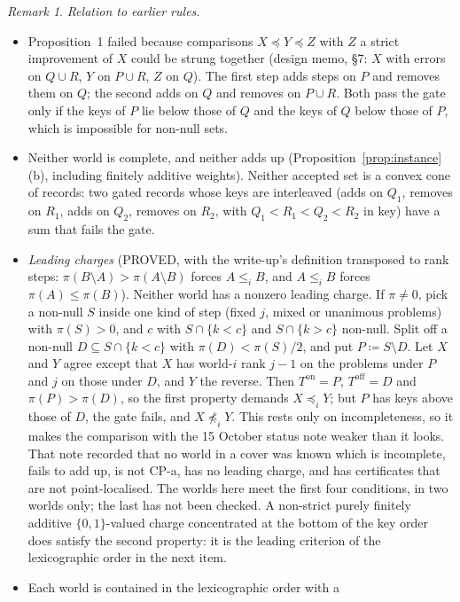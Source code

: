 \documentclass[11pt]{article}
\theoremstyle{definition}\newtheorem{definition}[theorem]{Definition}
\theoremstyle{remark}\newtheorem{remark}[theorem]{Remark}
\newcommand{\on}{\mathrm{on}}
\newcommand{\off}{\mathrm{off}}
\begin{document}
\begin{remark}\label{rem:compare}
\emph{Relation to earlier rules.}
\begin{itemize}[leftmargin=*,itemsep=2pt]
\item Proposition~1 failed because comparisons $X\preceq Y\preceq Z$ with
$Z$ a strict improvement of $X$ could be strung together (design memo, \S7: $X$
with errors on $Q\cup R$, $Y$ on $P\cup R$, $Z$ on $Q$). The first step adds
steps on $P$ and removes them on $Q$; the second adds on $Q$ and removes on
$P\cup R$. Both pass the gate only if the keys of $P$ lie below those of $Q$
and the keys of $Q$ below those of $P$, which is impossible for non-null sets.
\item Neither world is complete, and neither adds up
(Proposition~\ref{prop:instance}(b), including finitely additive weights).
Neither accepted set is a convex cone of records: two gated records whose keys
are interleaved (adds on $Q_1$, removes on $R_1$, adds on $Q_2$, removes on
$R_2$, with $Q_1<R_1<Q_2<R_2$ in key) have a sum that fails the gate.
\item \emph{Leading charges} (PROVED, with the write-up's definition transposed
to rank steps: $\pi(B\setminus A)>\pi(A\setminus B)$ forces $A\le_iB$, and
$A\le_iB$ forces $\pi(A)\le\pi(B)$). Neither world has a nonzero leading charge.
If $\pi\ne0$, pick a non-null $S$ inside one kind of step (fixed $j$, mixed or
unanimous problems) with $\pi(S)>0$, and $c$ with $S\cap\{k<c\}$ and
$S\cap\{k>c\}$ non-null. Split off a non-null $D\subseteq S\cap\{k<c\}$ with
$\pi(D)<\pi(S)/2$, and put $P\coloneqq S\setminus D$. Let $X$ and $Y$ agree
except that $X$ has world-$i$ rank $j-1$ on the problems under $P$ and $j$ on
those under $D$, and $Y$ the reverse. Then $T^\on=P$, $T^\off=D$ and
$\pi(P)>\pi(D)$, so the first property demands $X\preceq_iY$; but $P$ has keys
above those of $D$, the gate fails, and $X\not\preceq_iY$. This rests only on
incompleteness, so it makes the comparison with the 15 October status note
weaker than it looks. That note recorded that no world in a cover was known
which is incomplete, fails to add up, is not CP-a, has no leading charge, and
has certificates that are not point-localised. The worlds here meet the first
four conditions, in two worlds only; the last has not been checked. A non-strict
purely finitely additive $\{0,1\}$-valued charge concentrated at the bottom of
the key order does satisfy the second property: it is the leading criterion of
the lexicographic order in the next item.
\item Each world is contained in the lexicographic order with a

\end{itemize}
\end{remark}
\end{document}
